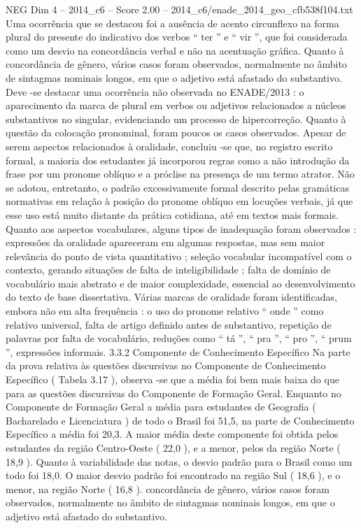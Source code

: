 \begin{textsample}{NEG Dim 4 – 2014\_c6 – Score 2.00 – 2014\_c6/enade\_2014\_geo\_cfb538f104.txt}
Uma ocorrência que se destacou foi a ausência de acento circunflexo na forma plural do presente do indicativo dos verbos “ ter ” e “ vir ”, que foi considerada como um desvio na concordância verbal e não na acentuação gráfica.
Quanto à concordância de gênero, vários casos foram observados, normalmente no âmbito de sintagmas nominais longos, em que o adjetivo está afastado do substantivo.
Deve -se destacar uma ocorrência não observada no ENADE/2013 : o aparecimento da marca de plural em verbos ou adjetivos relacionados a núcleos substantivos no singular, evidenciando um processo de hipercorreção.
Quanto à questão da colocação pronominal, foram poucos os casos observados.
Apesar de serem aspectos relacionados à oralidade, concluiu -se que, no registro escrito formal, a maioria dos estudantes já incorporou regras como a não introdução da frase por um pronome oblíquo e a próclise na presença de um termo atrator.
Não se adotou, entretanto, o padrão excessivamente formal descrito pelas gramáticas normativas em relação à posição do pronome oblíquo em locuções verbais, já que esse uso está muito distante da prática cotidiana, até em textos mais formais.
Quanto aos aspectos vocabulares, alguns tipos de inadequação foram observados : expressões da oralidade apareceram em algumas respostas, mas sem maior relevância do ponto de vista quantitativo ; seleção vocabular incompatível com o contexto, gerando situações de falta de inteligibilidade ; falta de domínio de vocabulário mais abstrato e de maior complexidade, essencial ao desenvolvimento do texto de base dissertativa.
Várias marcas de oralidade foram identificadas, embora não em alta frequência : o uso do pronome relativo “ onde ” como relativo universal, falta de artigo definido antes de substantivo, repetição de palavras por falta de vocabulário, reduções como “ tá ”, “ pra ”, “ pro ”, “ prum ”, expressões informais. 3.3.2 Componente de Conhecimento Específico Na parte da prova relativa às questões discursivas no Componente de Conhecimento Específico ( Tabela 3.17 ), observa -se que a média foi bem mais baixa do que para as questões discursivas do Componente de Formação Geral.
Enquanto no Componente de Formação Geral a média para estudantes de Geografia ( Bacharelado e Licenciatura ) de todo o Brasil foi 51,5, na parte de Conhecimento Específico a média foi 20,3.
A maior média deste componente foi obtida pelos estudantes da região Centro-Oeste ( 22,0 ), e a menor, pelos da região Norte ( 18,9 ).
Quanto à variabilidade das notas, o desvio padrão para o Brasil como um todo foi 18,0.
O maior desvio padrão foi encontrado na região Sul ( 18,6 ), e o menor, na região Norte ( 16,8 ). concordância de gênero, vários casos foram observados, normalmente no âmbito de sintagmas nominais longos, em que o adjetivo está afastado do substantivo.

\end{textsample}
